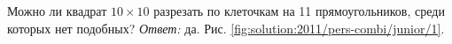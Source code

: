 \problem
Можно ли квадрат $10 \times 10$ разрезать по клеточкам на 11 прямоугольников,
среди которых нет подобных?
%
\label{solution:2011/pers-combi/junior/1}%
\emph{Ответ:} да.
Рис. \ref{fig:solution:2011/pers-combi/junior/1}.
\endproblem
